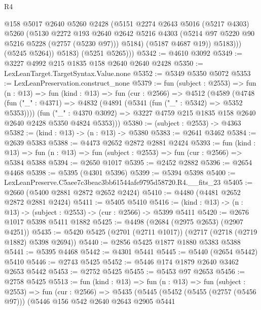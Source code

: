 \begin{lexlean}{R4}
\begin{coremodule}
                  @158
                  @5017
                  @2640
                  @5260
                  @2428
                  (@5151
                    @2274
                    @2643
                    @5016
                    (@5217 @4303)
                    @5260
                    (@5130
                      @2272
                      @193
                      @2640
                      @2642
                      @5216
                      @4303
                      (@5214 @97 @5220 @90 @5216 @5228 (@2757 (@5230 @97)))
                      @5184)
                    (@5187 @4687 @19))
                  @5183)))
            (@5245 @5264))
          @5183)
        (@5251 @5265)))
@5342 := @4610 @3092
@5349 := @3227 @4992 @215 @1835 @158 @2640 @2640 @2428
@5350 := LexLeanTarget.TargetSyntax.Value.none
@5352 := @5349 @5350 @5072
@5353 := LexLeanPreservation.construct_none
@5379 := fun (subject : @2553) =>
  fun (n : @13) =>
  fun (kind : @13) =>
  fun (cur : @2566) =>
  @4512
    (@4589
      (@4748
        (fun ("_" : @4371) => @4832 (@4891 (@5341 (fun ("_" : @5342) => @5352 @5353))))
        (fun ("_" : @4370 @3092) =>
        @3227 @4759 @215 @1835 @158 @2640 @2640 @2428 @5350 @4824 @5353)))
@5380 := (subject : @2553) -> @4363
@5382 := (kind : @13) -> (n : @13) -> @5380
@5383 := @2641 @3462
@5384 := @2639 @5383
@5388 := @4473 @2652 @2872 @2881 @2424
@5393 := fun (kind : @13) =>
  fun (n : @13) => fun (subject : @2553) => fun (cur : @2566) => @5384 @5388
@5394 := @2650 @1017
@5395 := @2452 @2882
@5396 := @2654 @4468
@5398 := @5395 (@4301 @5396)
@5399 := @5394 @5398
@5400 := LexLeanPreserve.C5aee7c3beac3bb61544afe9795d58720.R4.__fits_23
@5405 := @2660 (@5400 @2881 @2872 @2652 @2424)
@5410 := @4480 (@4481 @2652 @2872 @2881 @2424)
@5411 := @5405 @5410
@5416 := (kind : @13) -> (n : @13) -> (subject : @2553) -> (cur : @2566) -> @5399 @5411
@5420 := @2676 @1017 @5398 @5411 @1882
@5425 := @4498 (@2684 (@2975 @2653) (@2907 @4251))
@5435 := @5420 @5425 (@2701 (@2711 @1017)) (@2717 (@2718 (@2719 @1882) @5398 @2694))
@5440 := @2856 @5425 @1877 @1880 @5383 @5388
@5441 := @5395 @4468
@5442 := @4301 @5441
@5445 := @5440 (@2654 @5442) @5410
@5446 := @2743 @5425
@5452 := @5446 @174 @1879 @2640 @3462 @2653 @5442
@5453 := @2752 @5425
@5455 := @5453 @97 @2653
@5456 := @2758 @5425
@5513 := fun (kind : @13) =>
  fun (n : @13) =>
  fun (subject : @2553) =>
  fun (cur : @2566) =>
  @5435
    (@5445
      (@5452
        (@5455 (@2757 (@5456 @97)))
        (@5446
          @156
          @542
          @2640
          @2643
          @2905
          @5441

\end{coremodule}
\end{lexlean}
